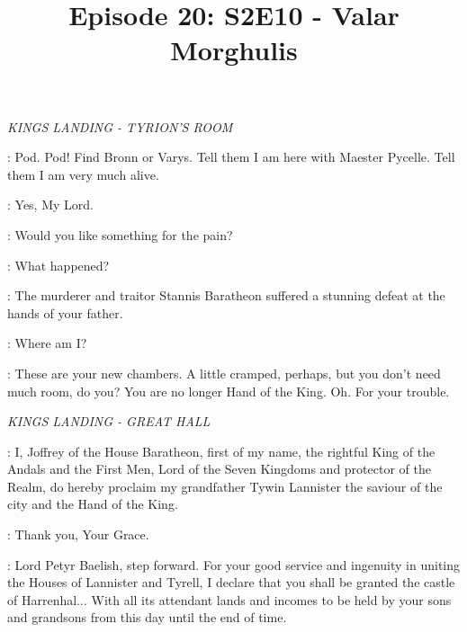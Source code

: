 ﻿

\title{Episode 20: S2E10 - Valar Morghulis}
\author{}
\date{}
\maketitle




\scene

\textit{KINGS LANDING - TYRION'S ROOM} 


\TYRION: Pod. Pod!  Find Bronn or Varys. Tell them I am here with Maester Pycelle. Tell them I am very much alive. 

\PODRICK: Yes, My Lord. 

\PYCELLE: Would you like something for the pain? 

\TYRION: What happened? 

\PYCELLE: The murderer and traitor Stannis Baratheon suffered a stunning defeat at the hands of your father. 

\TYRION: Where am I? 

\PYCELLE: These are your new chambers. A little cramped, perhaps, but you don't need much room, do you? You are no longer Hand of the King. Oh. For your trouble. 



\scene

\textit{KINGS LANDING - GREAT HALL} 


\JOFFREY: I, Joffrey of the House Baratheon, first of my name, the rightful King of the Andals and the First Men, Lord of the Seven Kingdoms and protector of the Realm, do hereby proclaim my grandfather Tywin Lannister the saviour of the city and the Hand of the King. 

\TYWIN: Thank you, Your Grace. 

\JOFFREY: Lord Petyr Baelish, step forward. For your good service and ingenuity in uniting the Houses of Lannister and Tyrell, I declare that you shall be granted the castle of Harrenhal$\ldots$ With all its attendant lands and incomes to be held by your sons and grandsons from this day until the end of time. 

